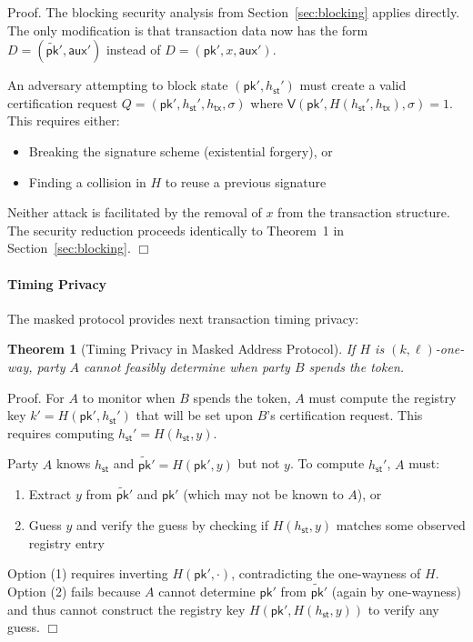 \documentclass{article}
\newtheorem{theorem}{Theorem}[section]
\newenvironment{proof}{\textsf{Proof}.}{\hfill$\Box$}
\newcommand{\sigver}[0]{\mathsf{V}}
\newcommand{\pubkey}[0]{\mathsf{pk}}
\newcommand{\mpubkey}{\widetilde{\pubkey}}
\newcommand{\sthash}[0]{{h_\mathsf{st}}}
\newcommand{\txhash}[0]{{h_\mathsf{tx}}}
\newcommand{\auxd}[0]{\mathsf{aux}}
\begin{document}
\begin{proof}
The blocking security analysis from Section~\ref{sec:blocking} applies directly. The only modification is that transaction data now has the form $D = (\mpubkey', \auxd')$ instead of $D = (\pubkey', x, \auxd')$.

An adversary attempting to block state $(\pubkey', \sthash')$ must create a valid certification request $Q = (\pubkey', \sthash', \txhash, \sigma)$ where $\sigver(\pubkey', H(\sthash', \txhash), \sigma) = 1$. This requires either:
\begin{itemize}
\item Breaking the signature scheme (existential forgery), or
\item Finding a collision in $H$ to reuse a previous signature
\end{itemize}

Neither attack is facilitated by the removal of $x$ from the transaction structure. The security reduction proceeds identically to Theorem~1 in Section~\ref{sec:blocking}.
\end{proof}

\paragraph{Timing Privacy}

The masked protocol provides next transaction timing privacy:

\begin{theorem}[Timing Privacy in Masked Address Protocol]
If $H$ is $(k, \ell)$-one-way, party $A$ cannot feasibly determine when party $B$ spends the token.
\end{theorem}

\begin{proof}
For $A$ to monitor when $B$ spends the token, $A$ must compute the registry key $k' = H(\pubkey', \sthash')$ that will be set upon $B$'s certification request. This requires computing $\sthash' = H(\sthash, y)$.

Party $A$ knows $\sthash$ and $\mpubkey' = H(\pubkey', y)$ but not $y$. To compute $\sthash'$, $A$ must:
\begin{enumerate}
\item Extract $y$ from $\mpubkey'$ and $\pubkey'$ (which may not be known to $A$), or
\item Guess $y$ and verify the guess by checking if $H(\sthash, y)$ matches some observed registry entry
\end{enumerate}

Option (1) requires inverting $H(\pubkey', \cdot)$, contradicting the one-wayness of $H$. Option (2) fails because $A$ cannot determine $\pubkey'$ from $\mpubkey'$ (again by one-wayness) and thus cannot construct the registry key $H(\pubkey', H(\sthash, y))$ to verify any guess.
\end{proof}
\end{document}
